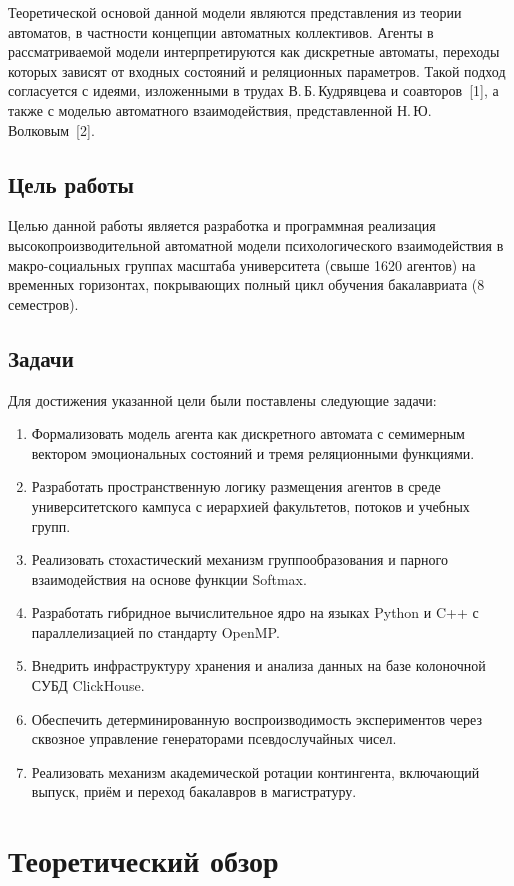 \documentclass[12pt]{article}
\begin{document}
Теоретической основой данной модели являются представления из теории автоматов, в частности концепции автоматных коллективов. Агенты в рассматриваемой модели интерпретируются как дискретные автоматы, переходы которых зависят от входных состояний и реляционных параметров. Такой подход согласуется с идеями, изложенными в трудах В.\,Б.\,Кудрявцева и соавторов~[1], а также с моделью автоматного взаимодействия, представленной Н.\,Ю.\,Волковым~[2].

\subsection*{Цель работы}
Целью данной работы является разработка и программная реализация высокопроизводительной автоматной модели психологического взаимодействия в макро-социальных группах масштаба университета (свыше 1620 агентов) на временных горизонтах, покрывающих полный цикл обучения бакалавриата (8 семестров).

\subsection*{Задачи}
Для достижения указанной цели были поставлены следующие задачи:
\begin{enumerate}
    \item Формализовать модель агента как дискретного автомата с семимерным вектором эмоциональных состояний и тремя реляционными функциями.
    \item Разработать пространственную логику размещения агентов в среде университетского кампуса с иерархией факультетов, потоков и учебных групп.
    \item Реализовать стохастический механизм группообразования и парного взаимодействия на основе функции Softmax.
    \item Разработать гибридное вычислительное ядро на языках Python и C++ с параллелизацией по стандарту OpenMP.
    \item Внедрить инфраструктуру хранения и анализа данных на базе колоночной СУБД ClickHouse.
    \item Обеспечить детерминированную воспроизводимость экспериментов через сквозное управление генераторами псевдослучайных чисел.
    \item Реализовать механизм академической ротации контингента, включающий выпуск, приём и переход бакалавров в магистратуру.
\end{enumerate}

\clearpage
\section{Теоретический обзор}
\end{document}
